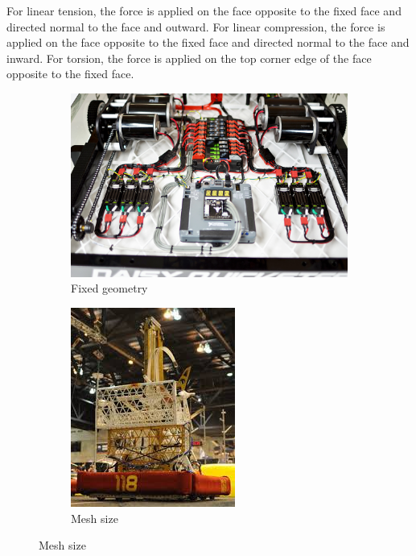 \documentclass[12pt, letterpaper]{article}
\begin{document}
For linear tension, the force is applied on the face opposite to the fixed face and directed normal to the face and outward. 
For linear compression, the force is applied on the face opposite to the fixed face and directed normal to the face and inward.
For torsion, the force is applied on the top corner edge of the face opposite to the fixed face. 

\begin{figure}[H]
	\centering
	\label{fig:procedure}
	\begin{subfigure}[t]{.3\linewidth}
		\includegraphics[width=\linewidth]{frc-ex1}
		\caption{Fixed geometry}
	\end{subfigure}
	\begin{subfigure}[t]{.3\linewidth}
		\includegraphics[width=\linewidth]{frc-ex2}
		\caption{Mesh size}
	\end{subfigure}
\end{figure}
\end{document}
